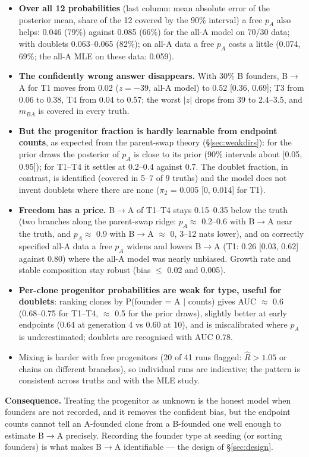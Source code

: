 \documentclass[10pt,a4paper]{article}
\newcommand{\BA}{B$\to$A}
\begin{document}
\begin{itemize}
\item \textbf{Over all 12 probabilities} (last column: mean absolute error of the posterior mean, share of the 12 covered by the 90\% interval) a free $p_A$ also helps: 0.046 (79\%) against 0.085 (66\%) for the all-A model on 70/30 data; with doublets 0.063--0.065 (82\%); on all-A data a free $p_A$ costs a little (0.074, 69\%; the all-A MLE on these data: 0.059).
\item \textbf{The confidently wrong answer disappears.} With 30\% B founders, \BA{} for T1 moves from 0.02 ($z = -39$, all-A model) to 0.52 [0.36, 0.69]; T3 from 0.06 to 0.38, T4 from 0.04 to 0.57; the worst $|z|$ drops from 39 to 2.4--3.5, and $m_{BA}$ is covered in every truth.
\item \textbf{But the progenitor fraction is hardly learnable from endpoint counts}, as expected from the parent-swap theory (\S\ref{sec:weakdirs}): for the prior draws the posterior of $p_A$ is close to its prior (90\% intervals about [0.05, 0.95]); for T1--T4 it settles at 0.2--0.4 against 0.7. The doublet fraction, in contrast, is identified (covered in 5--7 of 9 truths) and the model does not invent doublets where there are none ($\pi_2$ = 0.005 [0, 0.014] for T1).
\item \textbf{Freedom has a price.} \BA{} of T1--T4 stays 0.15--0.35 below the truth (two branches along the parent-swap ridge: $p_A \approx$ 0.2--0.6 with \BA{} near the truth, and $p_A \approx$ 0.9 with \BA{} $\approx$ 0, 3--12 nats lower), and on correctly specified all-A data a free $p_A$ widens and lowers \BA{} (T1: 0.26 [0.03, 0.62] against 0.80) where the all-A model was nearly unbiased. Growth rate and stable composition stay robust (bias $\le$ 0.02 and 0.005).
\item \textbf{Per-clone progenitor probabilities are weak for type, useful for doublets}: ranking clones by P(founder = A $\mid$ counts) gives AUC $\approx$ 0.6 (0.68--0.75 for T1--T4, $\approx$ 0.5 for the prior draws), slightly better at early endpoints (0.64 at generation 4 vs 0.60 at 10), and is miscalibrated where $p_A$ is underestimated; doublets are recognised with AUC 0.78.
\item Mixing is harder with free progenitors (20 of 41 runs flagged: $\hat R > 1.05$ or chains on different branches), so individual runs are indicative; the pattern is consistent across truths and with the MLE study.
\end{itemize}
\textbf{Consequence.} Treating the progenitor as unknown is the honest model when founders are not recorded, and it removes the confident bias, but the endpoint counts cannot tell an A-founded clone from a B-founded one well enough to estimate \BA{} precisely. Recording the founder type at seeding (or sorting founders) is what makes \BA{} identifiable --- the design of \S\ref{sec:design}.
\end{document}
